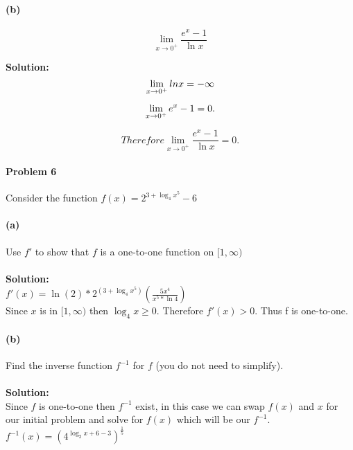 \documentclass[a4paper,11pt]{article}
\begin{document}
\newpage
\paragraph{(b)}
\begin{displaymath}
\lim_{x \to 0^+} \frac{e^x-1}{\ln{x}}
\end{displaymath}

\textbf{Solution:}
\begin{displaymath}
\lim_{x \to 0^+} ln{x} = -\infty \\
\end{displaymath}

\begin{displaymath}
\lim_{x \to 0^+} e^x-1 = 0. \\
\end{displaymath}

\begin{displaymath}
Therefore \lim_{x \to 0^+} \frac{e^x-1}{\ln{x}} = 0.
\end{displaymath}

\paragraph{Problem 6} Consider the function $f(x) = 2^{3+\log_4{x^5}}-6$

\paragraph{(a)} Use $f'$ to show that $f$ is a one-to-one function on $[1,\infty)$ \\ \\
\textbf{Solution:} \\
$f'(x) = \ln(2)*2^{(3+\log_4{x^5})}(\frac{5x^4}{x^5*\ln{4}})$ \\
Since $x$ is in $[1, \infty)$ then $\log_4{x} \geq 0$.  Therefore $f ' (x) > 0$.
Thus f is one-to-one.

\paragraph{(b)} Find the inverse function $f^{-1}$ for $f$ (you do not need
to simplify). \\ \\
\textbf{Solution: } \\
Since $f$ is one-to-one then $f^{-1}$ exist, in this case we can swap $f(x)$
and $x$ for our initial problem and solve for $f(x)$ which will be our $f^{-1}$. \\
$f^{-1}(x) = (4^{\log_2{x+6}-3})^{\frac{1}{5}}$
\end{document}
